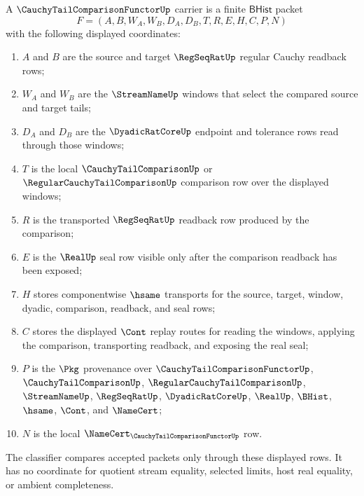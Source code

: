 \begin{definition}
\label{def:cauchy-tail-comparison-functor-carrier}
A $\CauchyTailComparisonFunctorUp$ carrier is a finite $\mathsf{BHist}$ packet
$$
F=(A,B,W_A,W_B,D_A,D_B,T,R,E,H,C,P,N)
$$
with the following displayed coordinates:
\begin{enumerate}
\item $A$ and $B$ are the source and target $\RegSeqRatUp$ regular Cauchy readback rows;
\item $W_A$ and $W_B$ are the $\StreamNameUp$ windows that select the compared source and target tails;
\item $D_A$ and $D_B$ are the $\DyadicRatCoreUp$ endpoint and tolerance rows read through those windows;
\item $T$ is the local $\CauchyTailComparisonUp$ or $\RegularCauchyTailComparisonUp$ comparison row over the displayed windows;
\item $R$ is the transported $\RegSeqRatUp$ readback row produced by the comparison;
\item $E$ is the $\RealUp$ seal row visible only after the comparison readback has been exposed;
\item $H$ stores componentwise $\hsame$ transports for the source, target, window, dyadic, comparison, readback, and seal rows;
\item $C$ stores the displayed $\Cont$ replay routes for reading the windows, applying the comparison, transporting readback, and exposing the real seal;
\item $P$ is the $\Pkg$ provenance over $\CauchyTailComparisonFunctorUp$, $\CauchyTailComparisonUp$, $\RegularCauchyTailComparisonUp$, $\StreamNameUp$, $\RegSeqRatUp$, $\DyadicRatCoreUp$, $\RealUp$, $\BHist$, $\hsame$, $\Cont$, and $\NameCert$;
\item $N$ is the local $\NameCert_{\CauchyTailComparisonFunctorUp}$ row.
\end{enumerate}
The classifier compares accepted packets only through these displayed rows. It has no coordinate for quotient stream equality, selected limits, host real equality, or ambient completeness.
\end{definition}

